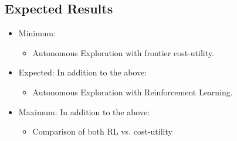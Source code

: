 \subsection{Expected Results}
\begin{itemize}
	\item Minimum:
	\begin{itemize}
		\item Autonomous Exploration with frontier cost-utility.
	\end{itemize}
	\item Expected:
	In addition to the above:
	\begin{itemize}
		\item Autonomous Exploration with Reinforcement Learning.
	\end{itemize}
	\item Maximum:
	In addition to the above:
	\begin{itemize}
		\item Comparison of both RL vs. cost-utility 
	\end{itemize}
\end{itemize}

